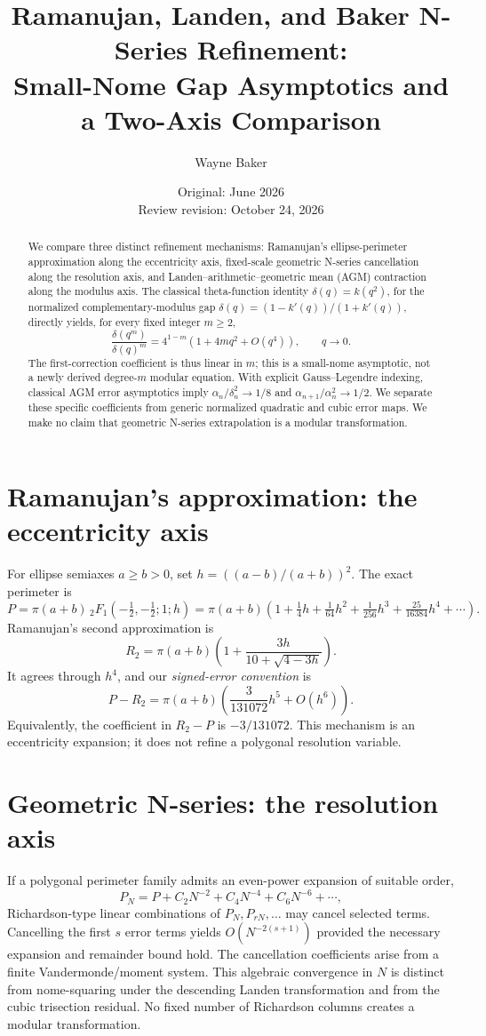 \documentclass[11pt]{article}
\title{Ramanujan, Landen, and Baker N-Series Refinement:\\Small-Nome Gap Asymptotics and a Two-Axis Comparison}
\author{Wayne Baker}
\date{Original: June 2026\\Review revision: October 24, 2026}
\begin{document}
\maketitle
\begin{abstract}
We compare three distinct refinement mechanisms: Ramanujan's ellipse-perimeter approximation along the eccentricity axis, fixed-scale geometric N-series cancellation along the resolution axis, and Landen--arithmetic--geometric mean (AGM) contraction along the modulus axis. The classical theta-function identity $\delta(q)=k(q^2)$, for the normalized complementary-modulus gap $\delta(q)=(1-k'(q))/(1+k'(q))$, directly yields, for every fixed integer $m\ge2$,
\[
\frac{\delta(q^m)}{\delta(q)^m}=4^{1-m}\left(1+4m q^2+O(q^4)\right),\qquad q\to0.
\]
The first-correction coefficient is thus linear in $m$; this is a small-nome asymptotic, not a newly derived degree-$m$ modular equation. With explicit Gauss--Legendre indexing, classical AGM error asymptotics imply $\alpha_n/\delta_n^2\to1/8$ and $\alpha_{n+1}/\alpha_n^2\to1/2$. We separate these specific coefficients from generic normalized quadratic and cubic error maps. We make no claim that geometric N-series extrapolation is a modular transformation.
\end{abstract}

\section{Ramanujan's approximation: the eccentricity axis}
For ellipse semiaxes $a\ge b>0$, set $h=((a-b)/(a+b))^2$. The exact perimeter is
\[
P=\pi(a+b)\,{}_2F_1(-\tfrac12,-\tfrac12;1;h)
=\pi(a+b)\left(1+\tfrac14h+\tfrac1{64}h^2+\tfrac1{256}h^3+\tfrac{25}{16384}h^4+\cdots\right).
\]
Ramanujan's second approximation is
\[
R_2=\pi(a+b)\left(1+\frac{3h}{10+\sqrt{4-3h}}\right).
\]
It agrees through $h^4$, and our \emph{signed-error convention} is
\[
\boxed{P-R_2=\pi(a+b)\left(\frac{3}{131072}h^5+O(h^6)\right).}
\]
Equivalently, the coefficient in $R_2-P$ is $-3/131072$. This mechanism is an eccentricity expansion; it does not refine a polygonal resolution variable.

\section{Geometric N-series: the resolution axis}
If a polygonal perimeter family admits an even-power expansion of suitable order,
\[
P_N=P+C_2N^{-2}+C_4N^{-4}+C_6N^{-6}+\cdots,
\]
Richardson-type linear combinations of $P_N,P_{rN},\ldots$ may cancel selected terms. Cancelling the first $s$ error terms yields $O(N^{-2(s+1)})$ provided the necessary expansion and remainder bound hold. The cancellation coefficients arise from a finite Vandermonde/moment system. This algebraic convergence in $N$ is distinct from nome-squaring under the descending Landen transformation and from the cubic trisection residual. No fixed number of Richardson columns creates a modular transformation.
\end{document}

